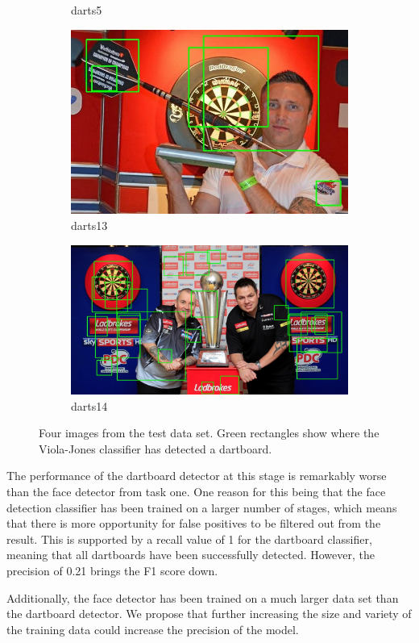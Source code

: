 \documentclass[conference]{IEEEtran}
\begin{document}
\begin{figure}[htb]
\begin{subfigure}{.5\linewidth}
  \caption{darts5}
  \label{fig:sub2}
\end{subfigure}
\begin{subfigure}{.5\linewidth}
  \centering
    \vspace{0.2cm}
  \includegraphics[width=.9\linewidth]{images/task2/detected13.jpg}
  \caption{darts13}
  \label{fig:sub1}
\end{subfigure}%
\begin{subfigure}{.5\linewidth}
  \centering
    \vspace{0.7cm}
  \includegraphics[width=.9\linewidth]{images/task2/detected14.jpg}
  \caption{darts14}
  \label{fig:sub2}
\end{subfigure}
\caption{Four images from the test data set. Green rectangles show where the Viola-Jones classifier has detected a dartboard.}
\end{figure}
\par
The performance of the dartboard detector at this stage is remarkably worse than the face detector from task one. One reason for this being that the face detection classifier has been trained on a larger number of stages, which means that there is more opportunity for false positives to be filtered out from the result. This is supported by a recall value of 1 for the dartboard classifier, meaning that all dartboards have been successfully detected. However, the precision of 0.21 brings the F1 score down. 
\par
Additionally, the face detector has been trained on a much larger data set than the dartboard detector. We propose that further increasing the size and variety of the training data could increase the precision of the model. 
\end{document}
